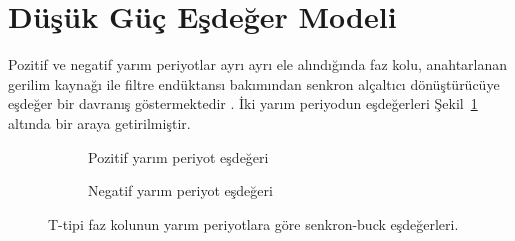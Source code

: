 \section{Düşük Güç Eşdeğer Modeli}
\label{sec:dusuk-guc-esdeger}

Pozitif ve negatif yarım periyotlar ayrı ayrı ele alındığında faz kolu, anahtarlanan gerilim kaynağı ile filtre endüktansı bakımından senkron alçaltıcı dönüştürücüye eşdeğer bir davranış göstermektedir \citep{Mohan2003,Erickson2001}. İki yarım periyodun eşdeğerleri Şekil~\ref{fig:senkron-buck-esdeger} altında bir araya getirilmiştir.

\begin{figure}[H]
  \centering
  \begin{subfigure}[t]{0.46\textwidth}
    \centering
    \caption{Pozitif yarım periyot eşdeğeri}
  \end{subfigure}\hfill
  \begin{subfigure}[t]{0.46\textwidth}
    \centering
    \caption{Negatif yarım periyot eşdeğeri}
  \end{subfigure}

  \vspace{3mm}
  \caption{T-tipi faz kolunun yarım periyotlara göre senkron-buck eşdeğerleri.}
  \label{fig:senkron-buck-esdeger}
\end{figure}

